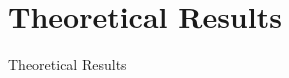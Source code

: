 \documentclass[beamer, t]{beamer}
\begin{document}

\section{Theoretical Results}

\begin{frame}
    \vfill
    \centering
    \LARGE{Theoretical Results}
    \vfill
\end{frame}
\end{document}
